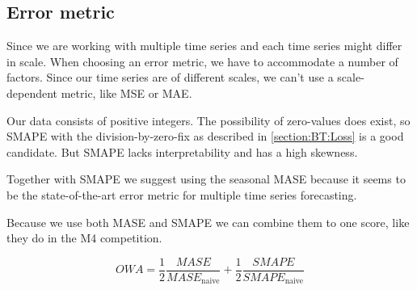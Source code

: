 \subsection{Error metric}



Since we are working with multiple time series and each time series might differ in scale.
When choosing an error metric, we have to accommodate a number of factors.
Since our time series are of different scales, we can't use a scale-dependent metric,
like MSE or MAE.

Our data consists of positive integers. The possibility of zero-values does exist,
so SMAPE with the division-by-zero-fix as described in \autoref{section:BT:Loss} is a good candidate.
But SMAPE lacks interpretability and has a high skewness.

Together with SMAPE we suggest using the seasonal MASE because it seems to be the
state-of-the-art error metric for multiple time series forecasting.

Because we use both MASE and SMAPE we can combine them to one score, like
they do in the M4 competition.

\begin{equation}
  \label{eq:OWA}
  OWA = \frac{1}{2} \frac{MASE}{MASE_{\text{naive}}} + \frac{1}{2} \frac{SMAPE}{SMAPE_{\text{naive}}}
\end{equation}
